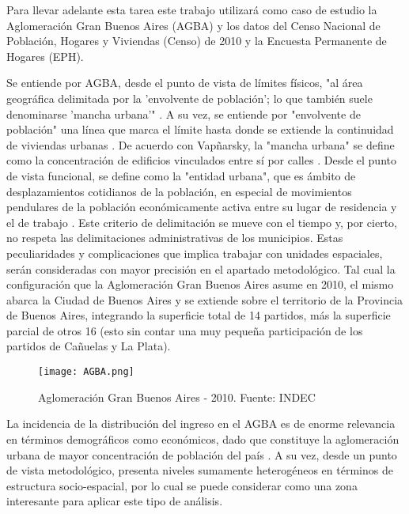 Para llevar adelante esta tarea este trabajo utilizará como caso de estudio la Aglomeración Gran Buenos Aires (AGBA) y los datos del Censo Nacional de Población, Hogares y Viviendas (Censo) de 2010 y la Encuesta Permanente de Hogares (EPH). 



Se entiende por AGBA, desde el punto de vista de límites físicos, "al área geográfica delimitada por la 'envolvente de población'; lo que también suele denominarse 'mancha urbana'" \cite{indec2003e}. A su vez, se entiende por "envolvente de población" una línea que marca el límite hasta donde se extiende la continuidad de viviendas urbanas \cite{indec2003e}. De acuerdo con Vapñarsky, la "mancha urbana" se define como la concentración de edificios vinculados entre sí por calles \cite{vapniarsky1995,vapniarsky1998}. Desde el punto de vista funcional, se define como la "entidad urbana", que es ámbito de desplazamientos cotidianos de la población, en especial de movimientos pendulares de la población económicamente activa entre su lugar de residencia y el de trabajo \cite{bertoncello,torres1990}. Este criterio de delimitación se mueve con el tiempo y, por cierto, no respeta las delimitaciones administrativas de los municipios.  Estas peculiaridades y complicaciones que implica trabajar con unidades espaciales, serán consideradas con mayor precisión en el apartado metodológico. Tal cual la configuración que la Aglomeración Gran Buenos Aires asume en 2010, el mismo abarca la Ciudad de Buenos Aires y se extiende sobre el territorio de la Provincia de Buenos Aires, integrando la superficie total de 14 partidos, más la superficie parcial de otros 16 (esto sin contar una muy pequeña participación de los partidos de Cañuelas y La Plata).

\begin{figure}[t]
	\begin{center}
		\texttt{[image: AGBA.png]}
		\caption{Aglomeración Gran Buenos Aires - 2010. Fuente: INDEC}
	\end{center}
\end{figure}


La incidencia de la distribución del ingreso en el AGBA es de enorme relevancia en términos demográficos como económicos, dado que constituye la aglomeración urbana de mayor concentración de población del país \cite{indec2012}. A su vez, desde un punto de vista metodológico, presenta niveles sumamente heterogéneos en términos de estructura socio-espacial, por lo cual se puede considerar como una zona interesante para aplicar este tipo de análisis. 

